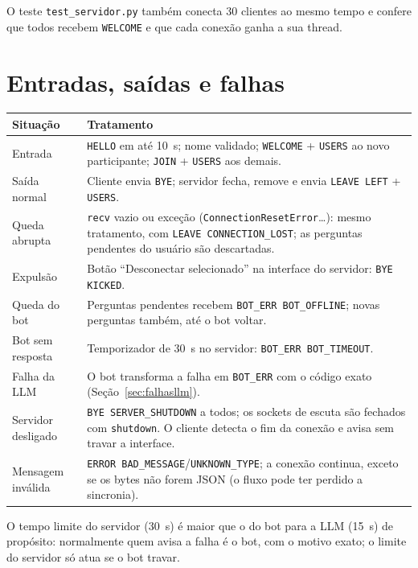 \documentclass[11pt,a4paper]{article}
\newcommand{\cod}[1]{\texttt{#1}}
\begin{document}
O teste \cod{test\_servidor.py} também conecta 30 clientes ao mesmo tempo e confere que todos recebem
\cod{WELCOME} e que cada conexão ganha a sua thread.

\section{Entradas, saídas e falhas}\label{sec:falhas}

\begin{center}
\small
\begin{tabularx}{\linewidth}{l X}
\toprule
\textbf{Situação} & \textbf{Tratamento} \\
\midrule
Entrada        & \cod{HELLO} em até 10~s; nome validado; \cod{WELCOME} + \cod{USERS} ao novo
                 participante; \cod{JOIN} + \cod{USERS} aos demais. \\
Saída normal   & Cliente envia \cod{BYE}; servidor fecha, remove e envia \cod{LEAVE LEFT} + \cod{USERS}. \\
Queda abrupta  & \cod{recv} vazio ou exceção (\cod{ConnectionResetError}\ldots): mesmo tratamento, com
                 \cod{LEAVE CONNECTION\_LOST}; as perguntas pendentes do usuário são descartadas. \\
Expulsão       & Botão ``Desconectar selecionado'' na interface do servidor: \cod{BYE KICKED}. \\
Queda do bot   & Perguntas pendentes recebem \cod{BOT\_ERR BOT\_OFFLINE}; novas perguntas também, até
                 o bot voltar. \\
Bot sem resposta & Temporizador de 30~s no servidor: \cod{BOT\_ERR BOT\_TIMEOUT}. \\
Falha da LLM   & O bot transforma a falha em \cod{BOT\_ERR} com o código exato (Seção~\ref{sec:falhasllm}). \\
Servidor desligado & \cod{BYE SERVER\_SHUTDOWN} a todos; os sockets de escuta são fechados com
                 \cod{shutdown}. O cliente detecta o fim da conexão e avisa sem travar a interface. \\
Mensagem inválida & \cod{ERROR BAD\_MESSAGE}/\cod{UNKNOWN\_TYPE}; a conexão continua, exceto se os
                 bytes não forem JSON (o fluxo pode ter perdido a sincronia). \\
\bottomrule
\end{tabularx}
\end{center}

O tempo limite do servidor (30~s) é maior que o do bot para a LLM (15~s) de propósito: normalmente
quem avisa a falha é o bot, com o motivo exato; o limite do servidor só atua se o bot travar.
\end{document}
